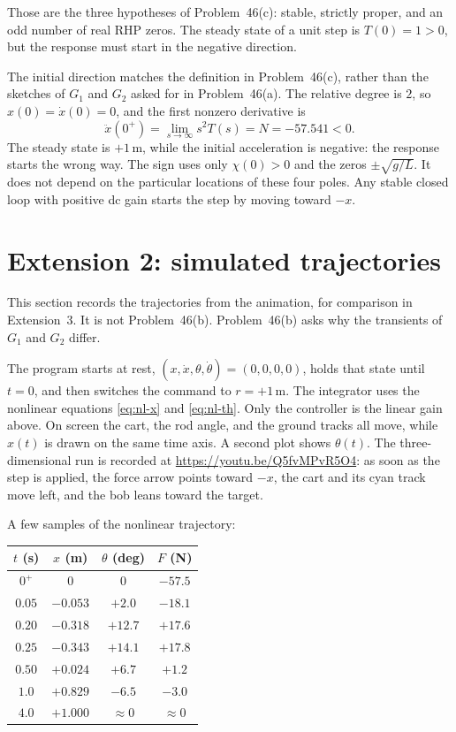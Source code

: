 \documentclass[12pt,a4paper]{article}
\begin{document}
Those are the three hypotheses of Problem~46(c): stable, strictly proper, and an odd number of real RHP zeros.
The steady state of a unit step is \(T(0)=1>0\), but the response must start in the negative direction.

The initial direction matches the definition in Problem~46(c), rather than the sketches of \(G_1\) and \(G_2\) asked for in Problem~46(a).
The relative degree is \(2\), so \(x(0)=\dot x(0)=0\), and the first nonzero derivative is
\[
  \ddot x(0^+)=\lim_{s\to\infty}s^2T(s)=N=-57.541<0.
\]
The steady state is \(+1\,\mathrm{m}\), while the initial acceleration is negative: the response starts the wrong way.
The sign uses only \(\chi(0)>0\) and the zeros \(\pm\sqrt{g/L}\). It does not depend on the particular locations of these four poles.
Any stable closed loop with positive dc gain starts the step by moving toward \(-x\).

\section{Extension 2: simulated trajectories}

This section records the trajectories from the animation, for comparison in Extension~3.
It is not Problem~46(b). Problem~46(b) asks why the transients of \(G_1\) and \(G_2\) differ.

The program starts at rest, \((x,\dot x,\theta,\dot\theta)=(0,0,0,0)\), holds that state until \(t=0\), and then switches the command to \(r=+1\,\mathrm{m}\).
The integrator uses the nonlinear equations \eqref{eq:nl-x} and \eqref{eq:nl-th}. Only the controller is the linear gain above.
On screen the cart, the rod angle, and the ground tracks all move, while \(x(t)\) is drawn on the same time axis. A second plot shows \(\theta(t)\).
The three-dimensional run is recorded at \url{https://youtu.be/Q5fvMPvR5O4}:
as soon as the step is applied, the force arrow points toward \(-x\), the cart and its cyan track move left, and the bob leans toward the target.

A few samples of the nonlinear trajectory:

\begin{center}
\begin{tabular}{@{}cccc@{}}
\toprule
\(t\) (s) & \(x\) (m) & \(\theta\) (deg) & \(F\) (N) \\
\midrule
\(0^+\)   & \(0\)      & \(0\)        & \(-57.5\) \\
\(0.05\)  & \(-0.053\) & \(+2.0\)     & \(-18.1\) \\
\(0.20\)  & \(-0.318\) & \(+12.7\)    & \(+17.6\) \\
\(0.25\)  & \(-0.343\) & \(+14.1\)    & \(+17.8\) \\
\(0.50\)  & \(+0.024\) & \(+6.7\)     & \(+1.2\) \\
\(1.0\)   & \(+0.829\) & \(-6.5\)     & \(-3.0\) \\
\(4.0\)   & \(+1.000\) & \(\approx 0\) & \(\approx 0\) \\
\bottomrule
\end{tabular}
\end{center}
\end{document}
